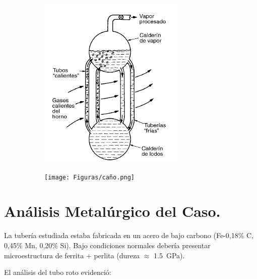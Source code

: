 \documentclass[12pt,a4paper]{article}
\begin{document}
\begin{figure} [h!]
    \centering
    \begin{subfigure}{0.45\textwidth}
        \includegraphics[width=\textwidth]{Figuras/Caldera.png}
        \label{fig:caldera}
    \end{subfigure}
    \begin{subfigure}{0.45\textwidth}
        \texttt{[image: Figuras/caño.png]}
        \label{fig:tubo}
    \end{subfigure}
\end{figure}

\section{Análisis Metalúrgico del Caso.}
La tubería estudiada estaba fabricada en un acero de bajo carbono (Fe-0,18\% C, 0,45\% Mn, 0,20\% Si). Bajo condiciones normales debería presentar microestructura de ferrita $+$ perlita (dureza $\approx$ \SI{1,5}{\giga\pascal}).

El análisis del tubo roto evidenció:
\end{document}
